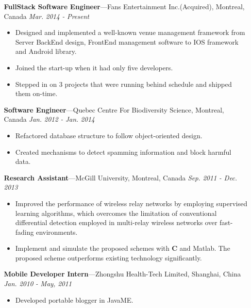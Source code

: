 \documentclass[11pt]{article}
\newenvironment{changemargin}[2]{%
  \begin{list}{}{%
    \setlength{\topsep}{0pt}%
    \setlength{\leftmargin}{#1}%
    \setlength{\rightmargin}{#2}%
    \setlength{\listparindent}{\parindent}%
    \setlength{\itemindent}{\parindent}%
    \setlength{\parsep}{\parskip}%
  }%
  \item[]}{\end{list}
}
\newenvironment{body} {
	\vspace*{-16pt}
	\begin{changemargin}{-0.25in}{-0.5in}
  }	
	{\end{changemargin}
}
\begin{document}
\begin{body}
	\vspace{14pt}
	\textbf{FullStack Software Engineer}---Fans Entertainment Inc.(Acquired), Montreal, Canada  \hfill \emph{Mar. 2014 - Present}\\
	\begin{itemize} \itemsep -0pt  %
		\item Designed and implemented a well-known venue management framework from Server BackEnd design, FrontEnd management software to IOS framework and Android library.
		\item Joined the start-up when it had only five developers.
		\item Stepped in on 3 projects that were running behind schedule and shipped them on-time.
	\end{itemize}

	\textbf{Software Engineer}---Quebec Centre For Biodiversity Science, Montreal, Canada  \hfill \emph{Jan. 2012 - Jan. 2014}\\
	\begin{itemize} \itemsep -0pt  %
		\item Refactored database structure to follow object-oriented design.
		\item Created mechanisms to detect spamming information and block harmful data.
	\end{itemize}	
	
	\textbf{Research Assistant}---McGill University, Montreal, Canada  \hfill \emph{Sep. 2011 - Dec. 2013}\\
	\vspace*{-4pt}
	\begin{itemize} \itemsep -0pt  %
\item Improved the performance of wireless relay networks by employing supervised learning algorithms, which overcomes the limitation of conventional differential detection employed in multi-relay wireless networks over fast-fading environments.
\item Implement and simulate the proposed schemes with \textbf{C} and Matlab. The proposed scheme outperforms existing technology significantly.
	\end{itemize}
	
	\textbf{Mobile Developer Intern}---Zhongshu Health-Tech Limited, Shanghai, China \hfill \emph{Jan. 2010 - May, 2011}\\
	\begin{itemize} \itemsep -0pt  %
		\item Developed portable blogger in JavaME.
	\end{itemize}
\end{body}
\smallskip
\end{document}
